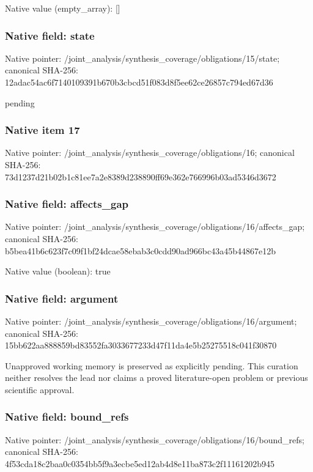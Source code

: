 \documentclass[10pt,a4paper]{article}
\begin{document}
Native value (empty\_\allowbreak{}array): []

\subsubsection{Native field: state}
Native pointer: /joint\_\allowbreak{}analysis/synthesis\_\allowbreak{}coverage/obligations/15/state; canonical SHA-256: 12adac54ac6f7140109391b670b3cbcd51f083d8f5ee62ce26857c794ed67d36

\begingroup\raggedright\sloppy pending\par\endgroup

\subsubsection{Native item 17}
Native pointer: /joint\_\allowbreak{}analysis/synthesis\_\allowbreak{}coverage/obligations/16; canonical SHA-256: 73d1237d21b02b1c81ee7a2e8389d238890ff69e362e766996b03ad5346d3672

\subsubsection{Native field: affects\_\allowbreak{}gap}
Native pointer: /joint\_\allowbreak{}analysis/synthesis\_\allowbreak{}coverage/obligations/16/affects\_\allowbreak{}gap; canonical SHA-256: b5bea41b6c623f7c09f1bf24dcae58ebab3c0cdd90ad966bc43a45b44867e12b

Native value (boolean): true

\subsubsection{Native field: argument}
Native pointer: /joint\_\allowbreak{}analysis/synthesis\_\allowbreak{}coverage/obligations/16/argument; canonical SHA-256: 15bb622aa888859bd83552fa3033677233d47f11da4e5b25275518c041f30870

\begingroup\raggedright\sloppy Unapproved working memory is preserved as explicitly pending. This curation neither resolves the lead nor claims a proved literature-open problem or previous scientific approval.\par\endgroup

\subsubsection{Native field: bound\_\allowbreak{}refs}
Native pointer: /joint\_\allowbreak{}analysis/synthesis\_\allowbreak{}coverage/obligations/16/bound\_\allowbreak{}refs; canonical SHA-256: 4f53cda18c2baa0c0354bb5f9a3ecbe5ed12ab4d8e11ba873c2f11161202b945
\end{document}
